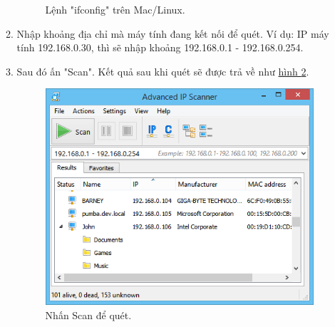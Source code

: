 \begin{itemize}
\begin{enumerate}
\begin{center}
\begin{figure}[htp]
\begin{center}
\end{center}
\caption{Lệnh "ifconfig" trên Mac/Linux.}
\label{refhinh1}
\end{figure}
\end{center}
\newpage
\item Nhập khoảng địa chỉ mà máy tính đang kết nối để quét. Ví dụ: IP máy tính 192.168.0.30, thì sẽ nhập khoảng 192.168.0.1 - 192.168.0.254. 
\item Sau đó ấn "Scan". Kết quả sau khi quét sẽ được trả về như \hyperref[ips]{hình \ref*{ips}}.
\begin{center}
\begin{figure}[htp]
\begin{center}
\includegraphics[scale=0.6]{image3/ipscanner.png}
\end{center}
\caption{Nhấn Scan để quét.}
\label{ips}
\end{figure}
\end{center}
\end{enumerate}
\end{itemize}
 
